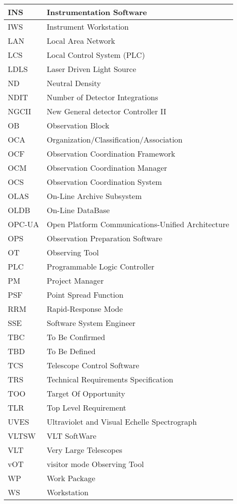 \begin{longtable*}{ |l|l| }
INS & Instrumentation Software \\ \hline
IWS & Instrument Workstation \\ \hline
LAN & Local Area Network \\ \hline
LCS & Local Control System (PLC) \\ \hline
LDLS & Laser Driven Light Source \\ \hline
ND & Neutral Density \\ \hline
NDIT & Number of Detector Integrations \\ \hline
NGCII & New General detector Controller II \\ \hline
OB & Observation Block \\ \hline
OCA & Organization/Classification/Association \\ \hline
OCF & Observation Coordination Framework \\ \hline
OCM & Observation Coordination Manager \\ \hline
OCS & Observation Coordination System \\ \hline
OLAS & On-Line Archive Subsystem \\ \hline
OLDB & On-Line DataBase \\ \hline
OPC-UA & Open Platform Communications-Unified Architecture \\ \hline
OPS & Observation Preparation Software \\ \hline
OT & Observing Tool \\ \hline
PLC & Programmable Logic Controller \\ \hline
PM & Project Manager \\ \hline
PSF & Point Spread Function \\ \hline
RRM & Rapid-Response Mode \\ \hline
SSE & Software System Engineer \\ \hline
TBC & To Be Confirmed \\ \hline
TBD & To Be Defined \\ \hline
TCS & Telescope Control Software \\ \hline
TRS & Technical Requirements Specification \\ \hline
TOO & Target Of Opportunity \\ \hline
TLR & Top Level Requirement \\ \hline
UVES & Ultraviolet and Visual Echelle Spectrograph \\ \hline
VLTSW & VLT SoftWare \\ \hline
VLT & Very Large Telescopes \\ \hline
vOT & visitor mode Observing Tool \\ \hline
WP & Work Package \\ \hline
WS & Workstation \\ \hline
\end{longtable*}
